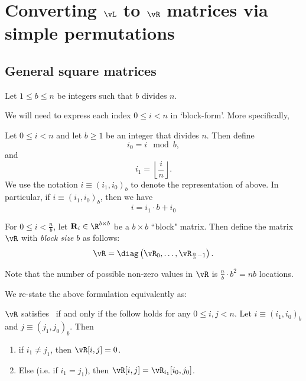 
\newcommand{\baseb}[3]{\parens{{#1},{#2}}_{{#3}}}
\newcommand{\mx}[1]{\mathbf{#1}}
\newcommand{\floors}[1]{\left \lfloor #1 \right \rfloor}
\newcommand{\parens}[1]{\left( {#1}\right)}

\section{Converting $\vL$ to $\vR$ matrices via simple permutations}
\label{sec:permutation}
\subsection{General square matrices}


Let $1\le b\le n$ be integers such that $b$ divides $n$.

We will need to express each index $0\le i<n$ in `block-form'. More specifically,


\begin{definition}\label{def:$i$}
Let $0\le i<n$ and let $b \ge 1$ be an integer that divides $n$. Then define
\[i_0=i\mod{b},\]
and
\[i_1=\floors{\frac in}.\] 
We use the notation $i\equiv\baseb{i_1}{i_0}{b}$ to denote the representation of  above. In particular, if $i\equiv(i_1,i_0)_{b}$,
then we have
\[
        i = i_1 \cdot b + i_0
\]
\end{definition}


\begin{definition}[Square $\vR$] For $0\le i< \frac {n}{b}$, let $\mx{R}_{i}\in\R^{b \times b }$ be a $b \times b $ ``block" matrix. Then define the matrix $\vR$ with {\em block size} $b$ as follows:
\begin{equation}
 \label{eq:def-R}
  \vR = \diag\left(\vR_0, \dots, \vR_{\frac {n}{b}-1}\right).
\end{equation}
\end{definition}
Note that the number of possible non-zero values in $\vR$ is $\frac {n}{b}\cdot b^2=nb$ locations.


We re-state the above formulation equivalently as:
\begin{proposition}

\label{prop:R-eqv-def}
$\vR$ satisfies~ if and only if the follow holds for any
$0\le i,j< n$. Let $i\equiv\baseb{i_1}{i_0}{b}$ and $j\equiv\baseb{j_1}{j_0}{b}$.  Then
\begin{enumerate}
    \item\label{item:zero-loc-R} if $i_1\ne j_1$, then $\vR[i,j]=0$. 
    \item \label{item:non-zero-loc-R} Else (i.e. if $i_1=j_1$), then $\vR[i,j]=\vR_{i_1}[i_0,j_0]$.
\end{enumerate}

\end{proposition}



